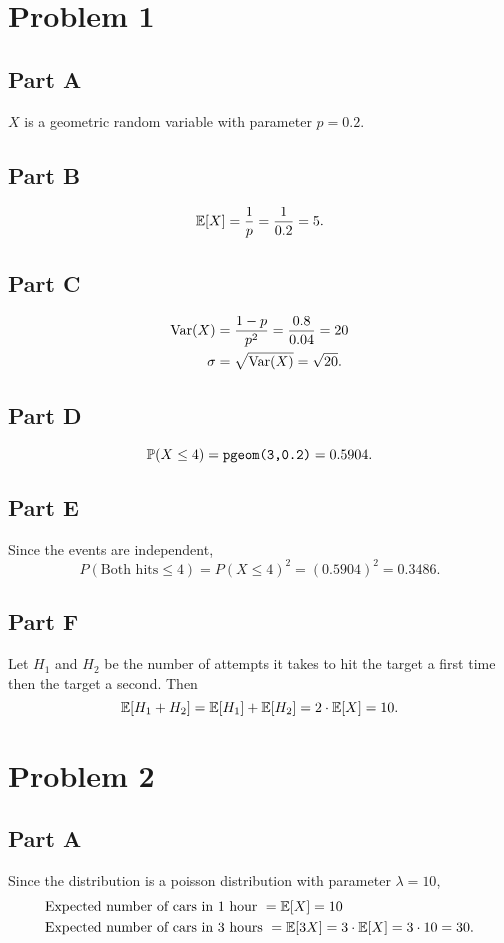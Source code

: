 \documentclass[12pt]{extarticle}
\begin{document}
\section*{Problem 1}
\subsection*{Part A}
$X$ is a geometric random variable with parameter $p = 0.2$.

\subsection*{Part B}
\[
	\mathbb{E}\qty[X] = \frac{1}{p} = \frac{1}{0.2} = 5
.\]

\subsection*{Part C}
\begin{align*}
	\text{Var}\qty(X) &= \frac{1-p}{p^2} = \frac{0.8}{0.04} = 20 \\
	\sigma &= \sqrt{\text{Var}\qty(X)} = \sqrt{20}
.\end{align*}

\subsection*{Part D}
\[
	\Prob{X \leq 4} = \verb|pgeom(3,0.2)| = 0.5904
.\]

\subsection*{Part E}
Since the events are independent,
\[
	P(\text{Both hits} \leq 4) = P(X \leq 4)^2 = (0.5904)^2 = 0.3486
.\]

\subsection*{Part F}
Let $H_1$ and $H_2$ be the number of attempts it takes to hit the target a first time then the target a second. Then
\[
	\mathbb{E}\qty[H_1 + H_2] = \mathbb{E}\qty[H_1] + \mathbb{E}\qty[H_2] = 2 \cdot \mathbb{E}\qty[X] = 10
.\]

\section*{Problem 2}
\subsection*{Part A}
Since the distribution is a poisson distribution with parameter $\lambda = 10$,
\begin{align*}
	&\text{Expected number of cars in $1$ hour } = \mathbb{E}\qty[X] = 10 \\
	&\text{Expected number of cars in $3$ hours } = \mathbb{E}\qty[3X] = 3 \cdot\mathbb{E}\qty[X] = 3 \cdot 10 = 30
.\end{align*}
\end{document}
